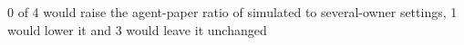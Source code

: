 0 of 4 would raise the agent-paper ratio of simulated to several-owner settings, 1 would lower it and 3 would leave it unchanged